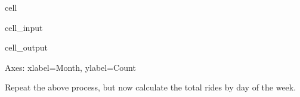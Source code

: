 \documentclass[letterpaper,10pt,english]{sphinxmanual}
\begin{document}
\begin{sphinxuseclass}{cell}
\begin{sphinxuseclass}{cell_input}
\begin{sphinxVerbatim}[commandchars=\\\{\}]
  
\end{sphinxVerbatim}

\end{sphinxuseclass}
\begin{sphinxuseclass}{cell_output}
\begin{sphinxVerbatim}[commandchars=\\\{\}]
\PYGZlt{}Axes: xlabel=\PYGZsq{}Month\PYGZsq{}, ylabel=\PYGZsq{}Count\PYGZsq{}\PYGZgt{}
\end{sphinxVerbatim}

\noindent{}

\end{sphinxuseclass}
\end{sphinxuseclass}
\sphinxAtStartPar
{}

\sphinxAtStartPar
Repeat the above process, but now calculate the total rides by day of the week.
\end{document}
